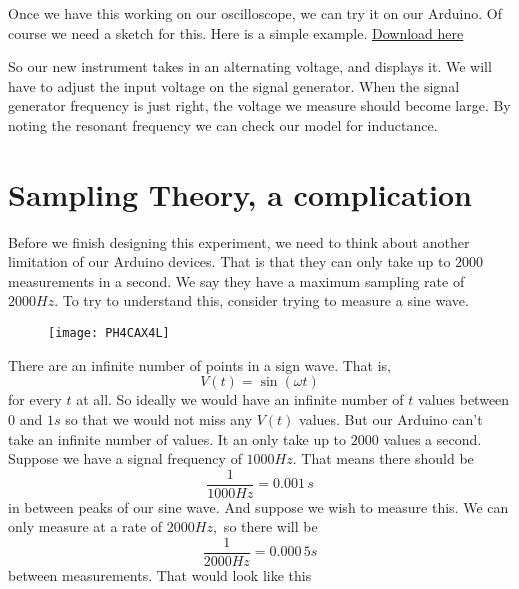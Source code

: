 Once we have this working on our oscilloscope, we can try it on our Arduino. Of course we need a sketch for this. Here is a simple example.
\vspace{0.25in}
\href{https://dtoliphant.github.io/PH250Manual/Code/RLCPart2_pm5Vsignal.ino}{Download here}


So our new instrument takes in an alternating voltage, and displays it. We
will have to adjust the input voltage on the signal generator. When the
signal generator frequency is just right, the voltage we measure should
become large. By noting the resonant frequency we can check our model for
inductance.

\section{Sampling Theory, a complication}

Before we finish designing this experiment, we need to think about another
limitation of our Arduino devices. That is that they can only take up to $2000$ measurements in a second. We say they have a maximum sampling rate of $2000\unit{Hz}.$ To try to understand this, consider trying to measure a sine wave.

\begin{figure}[h!]
	\centering
	\texttt{[image: PH4CAX4L]}
\end{figure}
There are an infinite number of points in a sign wave. That is, 
\begin{equation*}
	V\left( t\right) =\sin \left( \omega t\right)
\end{equation*}
for every $t$ at all. So ideally we would have an infinite number of $t$
values between $0$ and $1\unit{s}$ so that we would not miss any $V\left(
t\right) $ values. But our Arduino can't take an infinite number of values. It an only take up to $2000$ values a second. Suppose we have a signal frequency of $1000\unit{Hz}.$ That means there should be 
\begin{equation*}
	\frac{1}{1000\unit{Hz}}=0.001\,\unit{s}
\end{equation*}
in between peaks of our sine wave. And suppose we wish to measure this. We
can only measure at a rate of $2000\unit{Hz},$ so there will be 
\begin{equation*}
	\frac{1}{2000\unit{Hz}}=0.000\,5\unit{s}
\end{equation*}
between measurements. That would look like this

